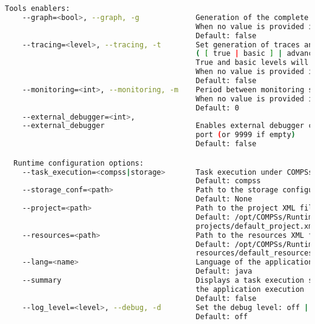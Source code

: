 \begin{lstlisting}[language=bash]
  Tools enablers:
    --graph=<bool>, --graph, -g             Generation of the complete graph (true/false)
                                            When no value is provided it is set to true
                                            Default: false
    --tracing=<level>, --tracing, -t        Set generation of traces and/or tracing level 
                                            ( [ true | basic ] | advanced | false)
                                            True and basic levels will produce the same traces.
                                            When no value is provided it is set to true
                                            Default: false
    --monitoring=<int>, --monitoring, -m    Period between monitoring samples (milliseconds)
                                            When no value is provided it is set to 2000
                                            Default: 0
    --external_debugger=<int>,
    --external_debugger                     Enables external debugger connection on the specified 
                                            port (or 9999 if empty)
                                            Default: false

  Runtime configuration options:
    --task_execution=<compss|storage>       Task execution under COMPSs or Storage.
                                            Default: compss
    --storage_conf=<path>                   Path to the storage configuration file
                                            Default: None
    --project=<path>                        Path to the project XML file
                                            Default: /opt/COMPSs/Runtime/configuration/xml/
                                            projects/default_project.xml
    --resources=<path>                      Path to the resources XML file
                                            Default: /opt/COMPSs/Runtime/configuration/xml/
                                            resources/default_resources.xml                                                 
    --lang=<name>                           Language of the application (java/c/python)
                                            Default: java
    --summary                               Displays a task execution summary at the end of 
                                            the application execution
                                            Default: false
    --log_level=<level>, --debug, -d        Set the debug level: off | info | debug
                                            Default: off
                                                                                                                                                                                        

\end{lstlisting}
